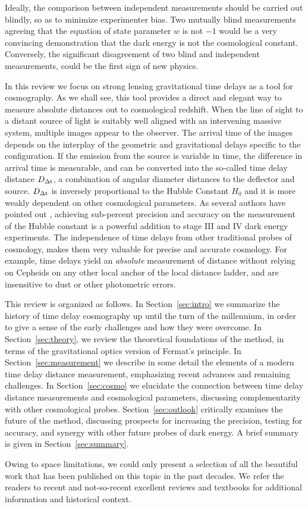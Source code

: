 Ideally, the comparison between independent measurements should be
carried out blindly, so as to minimize experimenter bias. Two mutually
blind measurements agreeing that the equation of state parameter $w$
is not $-1$ would be a very convincing demonstration that the dark
energy is not the cosmological constant. Conversely, the significant
disagreement of two blind and independent measurements, could be the
first sign of new physics.

In this review we focus on strong lensing gravitational time delays as
a tool for cosmography. As we shall see, this tool provides a direct
and elegant way to measure absolute distances out to cosmological
redshift. When the line of sight to a distant source of light is
suitably well aligned with an intervening massive system, multiple
images appear to the observer. The arrival time of the images depends
on the interplay of the geometric and gravitational delays specific to
the configuration. If the emission from the source is variable in
time, the difference in arrival time is measurable, and can be
converted into the so-called time delay distance $D_{\Delta{\rm t}}$, a combination
of angular diameter distances to the deflector and source. $D_{\Delta{\rm t}}$ is
inversely proportional to the Hubble Constant $H_0$ and it is more
weakly dependent on other cosmological parameters. As several authors
have pointed out \citep{Lin11,Suy++12,Wei++13}, achieving sub-percent
precision and accuracy on the measurement of the Hubble constant is a
powerful addition to stage III and IV dark energy experiments. The
independence of time delays from other traditional probes of
cosmology, makes them very valuable for precise and accurate
cosmology. For example, time delays yield an {\it absolute}
measurement of distance without relying on Cepheids on any other local
anchor of the local distance ladder, and are insensitive to dust or
other photometric errors.

This review is organized as follows. In Section~\ref{sec:intro} we
summarize the history of time delay cosmography up until the turn of
the millennium, in order to give a sense of the early challenges and
how they were overcome. In Section~\ref{sec:theory}, we review the
theoretical foundations of the method, in terms of the gravitational
optics version of Fermat's principle. In Section~\ref{sec:measurement}
we describe in some detail the elements of a modern time delay
distance measurement, emphasizing recent advances and remaining
challenges. In Section~\ref{sec:cosmo} we elucidate the connection
between time delay distance measurements and cosmological parameters,
discussing complementarity with other cosmological
probes. Section~\ref{sec:outlook} critically examines the future of
the method, discussing prospects for increasing the precision, testing
for accuracy, and synergy with other future probes of dark energy. A
brief summary is given in Section~\ref{sec:summary}.

Owing to space limitations, we could only present a selection of all
the beautiful work that has been published on this topic in the past
decades. We refer the readers to recent
\citep{Bar10,Ell10,Tre10,TMC12,Jackson:2013p30763,Jac15,T+E15} and not-so-recent \citep{B+N92,CSS02,K+S04,Fal05,SKW06}
excellent reviews and textbooks \citep{SEF92} for additional
information and historical context.
